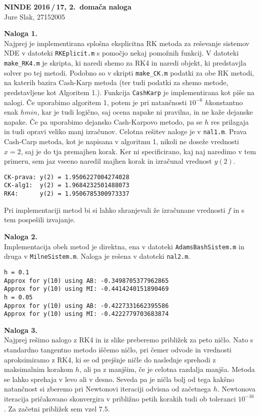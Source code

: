 \documentclass[a4paper,oneside,12pt]{article}
\title{\Title}
\author{\Author}
\date{\today}
\theoremstyle{definition}
\newcommand{\Title}{NINDE 2016\,/\,17, 2.\ domača naloga}
\begin{document}
\begin{center}
  \textbf{\large \Title} \\[12pt]
  Jure Slak, 27152005
\end{center}

\textbf{Naloga 1.} \\
Najprej je implementirana splošna eksplicitna RK metoda za reševanje sistemov
NDE v datoteki \verb|RKEplicit.m| s pomočjo nekaj pomožnih funkcij. V datoteki
\verb|make_RK4.m| je skripta, ki naredi shemo za RK4 in naredi objekt, ki
predstavjla solver po tej metodi. Podobno so v skripti \verb|make_CK.m| podatki
za obe RK metodi, na katerih bazira Cash-Karp metoda (ter tudi podatki za shemo
metode, predstavljene kot Algoritem 1.). Funkcija \verb|CashKarp| je
implementirana kot piše na nalogi. Če uporabimo algoritem 1, potem je pri
natančnosti $10^{-6}$ $h$konstantno enak $hmin$, kar je tudi logično, saj ocena
napake ni pravilna, in ne kaže dejanske napake. Če pa uporabimo dejansko
Cash-Karpovo metodo, pa se $h$ res prilagaja in tudi opravi veliko manj
izračunov. Celotna rešitev naloge je v \verb|nal1.m|. Prava Cash-Carp metoda,
kot je napisana v algoritmu 1, nikoli ne doseže vrednosti $x=2$, saj je do tja
premajhen korak. Ker ni specificirano, kaj naj naredimo v tem primeru, sem jaz
vseeno naredil majhen korak in izračunal vrednost $y(2)$.

\begin{verbatim}
CK-prava: y(2) = 1.9506227004274028
CK-alg1:  y(2) = 1.9684232501488073
RK4:      y(2) = 1.9506785300973337
\end{verbatim}

Pri implementaciji metod bi si lahko shranjevali že izračunane vrednosti $f$ in
s tem pospešili izvajanje.

\textbf{Naloga 2.} \\

Implementacija obeh metod je direktna, ena v datoteki
\verb|AdamsBashSistem.m| in druga v \verb|MilneSistem.m|.
Naloga je rešena v datoteki \verb|nal2.m|.

\begin{verbatim}
h = 0.1
Approx for y(10) using AB: -0.3498705377962865
Approx for y(10) using MI: -0.4414240151890469
h = 0.05
Approx for y(10) using AB: -0.4227331662395586
Approx for y(10) using MI: -0.4222779703683874
\end{verbatim}

\textbf{Naloga 3.} \\
Najprej rešimo nalogo z RK4 in iz slike preberemo približek za peto ničlo.
Nato s standardno tangentno metodo iščemo ničlo, pri čemer odvode in vrednosti
aproksimiramo z RK4, ki se od prejšnje ničle do naslednje sprehodi z maksimalnim
korakom $h$, ali pa z manjšim, če je celotna razdalja manjša. Metoda se lahko
sprehaja v levo ali v desno. Seveda pa je ničla bolj od tega kakšno natančnost
si zberemo pri Newtonovi iteraciji odvisna od začetnega $h$. Newtonova iteracija
pričakovano skonvergira v približno petih korakih tudi ob toleranci $10^{-16}$.
Za začetni približek sem vzel $7.5$.
\end{document}
